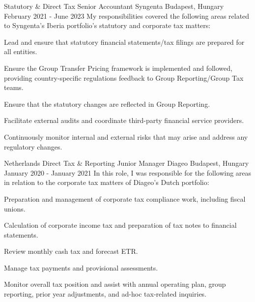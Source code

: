 \begin{cventries}
  \cventry
    {Statutory \& Direct Tax Senior Accountant} %
    {Syngenta} %
    {Budapest, Hungary} %
    {February 2021 - June 2023} %
    {My responsibilities covered the following areas related to Syngenta's Iberia portfolio's statutory and corporate tax matters:} %
    {
      \begin{cvitems} %
        \item {Lead and ensure that statutory financial statements/tax filings are prepared for all entities.}
        \item {Ensure the Group Transfer Pricing framework is implemented and followed, providing country-specific regulations feedback to Group Reporting/Group Tax teams.}
        \item {Ensure that the statutory changes are reflected in Group Reporting.}
        \item {Facilitate external audits and coordinate third-party financial service providers.}
        \item {Continuously monitor internal and external risks that may arise and address any regulatory changes.}
      \end{cvitems}
    }


  \cventry
    {Netherlands Direct Tax \& Reporting Junior Manager} %
    {Diageo} %
    {Budapest, Hungary} %
    {January 2020 - January 2021} %
    {In this role, I was responsible for the following areas in relation to the corporate tax matters of Diageo's Dutch portfolio:} %
    {
      \begin{cvitems} %
        \item {Preparation and management of corporate tax compliance work, including fiscal unions.}
        \item {Calculation of corporate income tax and preparation of tax notes to financial statements.}
        \item {Review monthly cash tax and forecast ETR.}
        \item {Manage tax payments and provisional assessments.}
        \item {Monitor overall tax position and assist with annual operating plan, group reporting, prior year adjustments, and ad-hoc tax-related inquiries.}
      \end{cvitems}
    }


\end{cventries}
